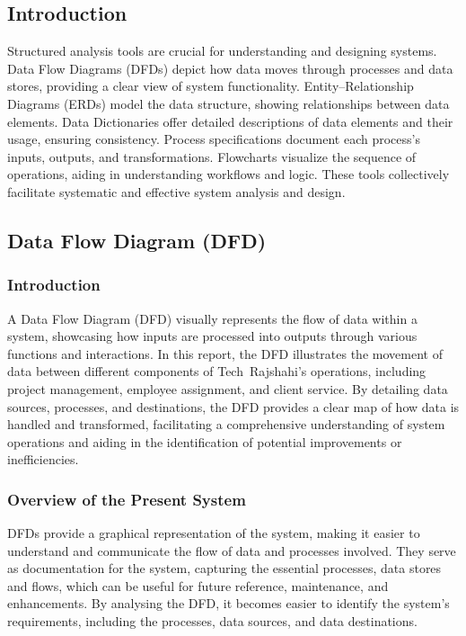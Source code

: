 \documentclass[12pt,a4paper]{article}
\begin{document}
\subsection{Introduction}
Structured analysis tools are crucial for understanding and designing systems.  Data Flow Diagrams (DFDs) depict how data moves through processes and data stores, providing a clear view of system functionality.  Entity–Relationship Diagrams (ERDs) model the data structure, showing relationships between data elements.  Data Dictionaries offer detailed descriptions of data elements and their usage, ensuring consistency.  Process specifications document each process’s inputs, outputs, and transformations.  Flowcharts visualize the sequence of operations, aiding in understanding workflows and logic.  These tools collectively facilitate systematic and effective system analysis and design.

\subsection{Data Flow Diagram (DFD)}
\subsubsection{Introduction}
A Data Flow Diagram (DFD) visually represents the flow of data within a system, showcasing how inputs are processed into outputs through various functions and interactions.  In this report, the DFD illustrates the movement of data between different components of Tech Rajshahi’s operations, including project management, employee assignment, and client service.  By detailing data sources, processes, and destinations, the DFD provides a clear map of how data is handled and transformed, facilitating a comprehensive understanding of system operations and aiding in the identification of potential improvements or inefficiencies.

\subsubsection{Overview of the Present System}
DFDs provide a graphical representation of the system, making it easier to understand and communicate the flow of data and processes involved.  They serve as documentation for the system, capturing the essential processes, data stores and flows, which can be useful for future reference, maintenance, and enhancements.  By analysing the DFD, it becomes easier to identify the system’s requirements, including the processes, data sources, and data destinations.
\end{document}
